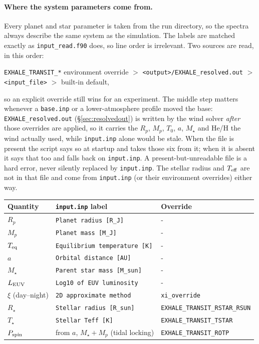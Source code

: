 \documentclass[english,a4paper]{my_memo}
\begin{document}
\paragraph{Where the system parameters come from.} Every planet and star
parameter is taken from the run directory, so the spectra always describe the
same system as the simulation. The labels are matched exactly as
\texttt{input\_read.f90} does, so line order is irrelevant. Two sources are
read, in this order:
\begin{center}
\texttt{EXHALE\_TRANSIT\_*} environment override $>$
\texttt{<output>/EXHALE\_resolved.out} $>$ \texttt{<input\_file>} $>$ built-in default,
\end{center}
so an explicit override still wins for an experiment. The middle step matters
whenever a \texttt{base.inp} or a lower-atmosphere profile moved the base:
\texttt{EXHALE\_resolved.out} (\S\ref{sec:resolvedout}) is written by the wind
solver \emph{after} those overrides are applied, so it carries the $R_p$,
$M_p$, $T_0$, $a$, $M_\star$ and He/H the wind actually used, while
\texttt{input.inp} alone would be stale. When the file is present the script
says so at startup and takes those six from it; when it is absent it says that
too and falls back on \texttt{input.inp}. A present-but-unreadable file is a
hard error, never silently replaced by \texttt{input.inp}. The stellar radius and $T_{\rm eff}$ are
not in that file and come from \texttt{input.inp} (or their environment
overrides) either way.

\begin{center}
\begin{tabular}{@{}lll@{}}
\hline
Quantity & \texttt{input.inp} label & Override \\
\hline
$R_p$          & \texttt{Planet radius [R\_J]}        & - \\
$M_p$          & \texttt{Planet mass [M\_J]}          & - \\
$T_{\rm eq}$   & \texttt{Equilibrium temperature [K]} & - \\
$a$            & \texttt{Orbital distance [AU]}       & - \\
$M_\star$      & \texttt{Parent star mass [M\_sun]}   & - \\
$L_{\rm EUV}$  & \texttt{Log10 of EUV luminosity}     & - \\
$\xi$ (day--night) & \texttt{2D approximate method}   & \texttt{xi\_override} \\
$R_\star$      & \texttt{Stellar radius [R\_sun]}     & \texttt{EXHALE\_TRANSIT\_RSTAR\_RSUN} \\
$T_\star$      & \texttt{Stellar Teff [K]}            & \texttt{EXHALE\_TRANSIT\_TSTAR} \\
$P_{\rm spin}$ & from $a$, $M_\star{+}M_p$ (tidal locking) & \texttt{EXHALE\_TRANSIT\_ROTP} \\
\hline
\end{tabular}
\end{center}
\end{document}
